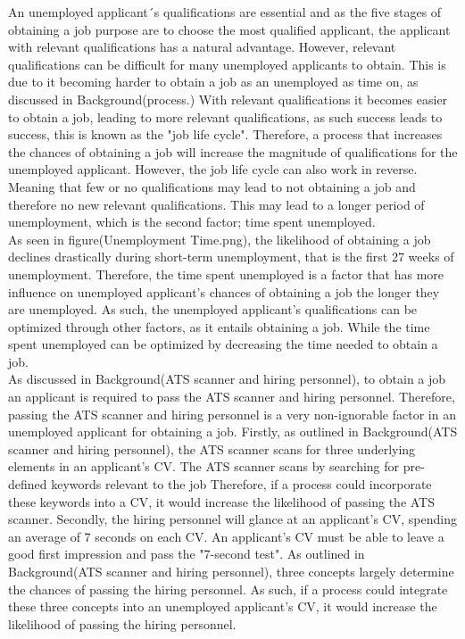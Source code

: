 An unemployed applicant´s qualifications are essential and as the five stages of obtaining a job purpose are to choose the most qualified applicant, the applicant with relevant qualifications has a natural advantage.
However, relevant qualifications can be difficult for many unemployed applicants to obtain.
This is due to it becoming harder to obtain a job as an unemployed as time on, as discussed in Background(process.)
With relevant qualifications it becomes easier to obtain a job, leading to more relevant qualifications, as such success leads to success, this is known as the "job life cycle".\cite{Job_Cycle}
Therefore, a process that increases the chances of obtaining a job will increase the magnitude of qualifications for the unemployed applicant.
However, the job life cycle can also work in reverse.
Meaning that few or no qualifications may lead to not obtaining a job and therefore no new relevant qualifications.
This may lead to a longer period of unemployment, which is the second factor; time spent unemployed. \\

As seen in figure(Unemployment Time.png), the likelihood of obtaining a job declines drastically during short-term unemployment, that is the first 27 weeks of unemployment.
Therefore, the time spent unemployed is a factor that has more influence on unemployed applicant's chances of obtaining a job the longer they are unemployed.
As such, the unemployed applicant's qualifications can be optimized through other factors, as it entails obtaining a job.
While the time spent unemployed can be optimized by decreasing the time needed to obtain a job. \\

As discussed in Background(ATS scanner and hiring personnel), to obtain a job an applicant is required to pass the ATS scanner and hiring personnel.
Therefore, passing the ATS scanner and hiring personnel is a very non-ignorable factor in an unemployed applicant for obtaining a job.
Firstly, as outlined in Background(ATS scanner and hiring personnel), the ATS scanner scans for three underlying elements in an applicant's CV.
The ATS scanner scans by searching for pre-defined keywords relevant to the job
Therefore, if a process could incorporate these keywords into a CV, it would increase the likelihood of passing the ATS scanner.
Secondly, the hiring personnel will glance at an applicant's CV, spending an average of 7 seconds on each CV.
An applicant's CV must be able to leave a good first impression and pass the "7-second test".
As outlined in Background(ATS scanner and hiring personnel), three concepts largely determine the chances of passing the hiring personnel.
As such, if a process could integrate these three concepts into an unemployed applicant's CV, it would increase the likelihood of passing the hiring personnel. \\

